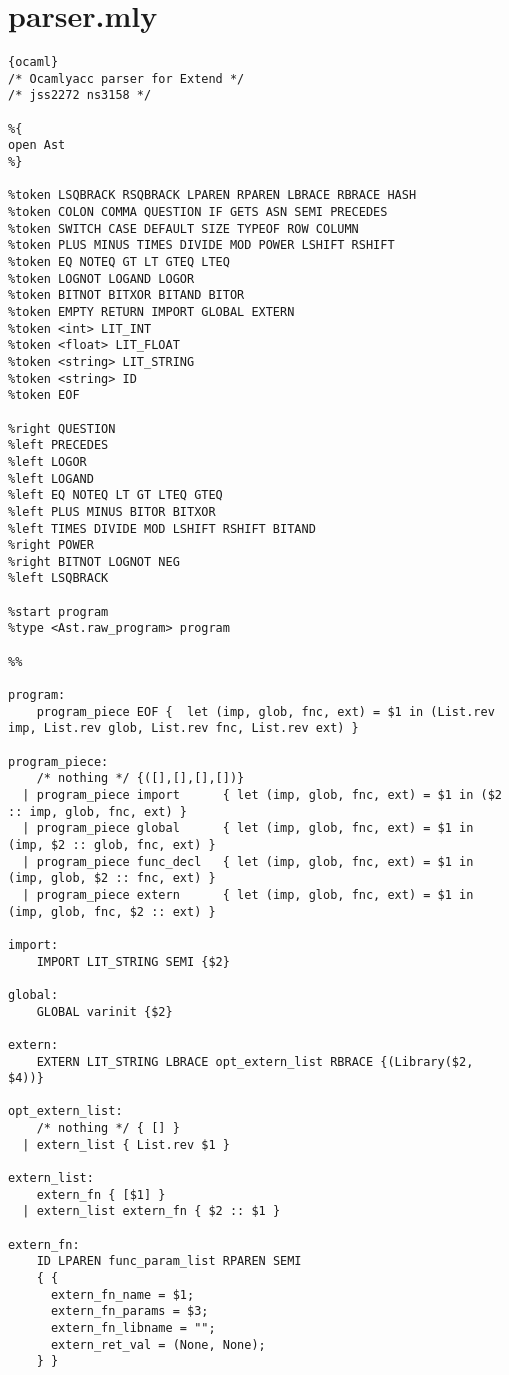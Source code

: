 \section{parser.mly}
\begin{lstlisting}{ocaml}
/* Ocamlyacc parser for Extend */
/* jss2272 ns3158 */

%{
open Ast
%}

%token LSQBRACK RSQBRACK LPAREN RPAREN LBRACE RBRACE HASH
%token COLON COMMA QUESTION IF GETS ASN SEMI PRECEDES
%token SWITCH CASE DEFAULT SIZE TYPEOF ROW COLUMN
%token PLUS MINUS TIMES DIVIDE MOD POWER LSHIFT RSHIFT
%token EQ NOTEQ GT LT GTEQ LTEQ
%token LOGNOT LOGAND LOGOR
%token BITNOT BITXOR BITAND BITOR
%token EMPTY RETURN IMPORT GLOBAL EXTERN
%token <int> LIT_INT
%token <float> LIT_FLOAT
%token <string> LIT_STRING
%token <string> ID
%token EOF

%right QUESTION
%left PRECEDES
%left LOGOR
%left LOGAND
%left EQ NOTEQ LT GT LTEQ GTEQ
%left PLUS MINUS BITOR BITXOR
%left TIMES DIVIDE MOD LSHIFT RSHIFT BITAND
%right POWER
%right BITNOT LOGNOT NEG
%left LSQBRACK

%start program
%type <Ast.raw_program> program

%%

program:
    program_piece EOF {  let (imp, glob, fnc, ext) = $1 in (List.rev imp, List.rev glob, List.rev fnc, List.rev ext) }

program_piece:
    /* nothing */ {([],[],[],[])}
  | program_piece import      { let (imp, glob, fnc, ext) = $1 in ($2 :: imp, glob, fnc, ext) }
  | program_piece global      { let (imp, glob, fnc, ext) = $1 in (imp, $2 :: glob, fnc, ext) }
  | program_piece func_decl   { let (imp, glob, fnc, ext) = $1 in (imp, glob, $2 :: fnc, ext) }
  | program_piece extern      { let (imp, glob, fnc, ext) = $1 in (imp, glob, fnc, $2 :: ext) }

import:
    IMPORT LIT_STRING SEMI {$2}

global:
    GLOBAL varinit {$2}

extern:
    EXTERN LIT_STRING LBRACE opt_extern_list RBRACE {(Library($2, $4))}

opt_extern_list:
    /* nothing */ { [] }
  | extern_list { List.rev $1 }

extern_list:
    extern_fn { [$1] }
  | extern_list extern_fn { $2 :: $1 }

extern_fn:
    ID LPAREN func_param_list RPAREN SEMI
    { {
      extern_fn_name = $1;
      extern_fn_params = $3;
      extern_fn_libname = "";
      extern_ret_val = (None, None);
    } }


\end{lstlisting}
